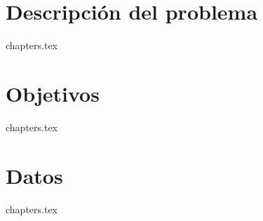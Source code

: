 \chapter{Descripci\'on del problema}
{chapters.tex}
\chapter{Objetivos}
{chapters.tex}
\chapter{Datos}
{chapters.tex}